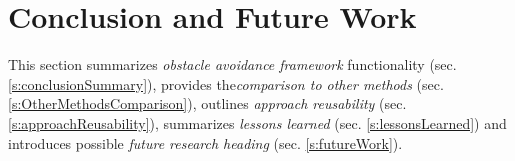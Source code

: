 \cleardoublepage
\chapter{Conclusion and Future Work}\label{ch:Conclusion}
\noindent This section summarizes \emph{obstacle avoidance framework} functionality (sec. \ref{s:conclusionSummary}), provides the\emph{comparison to other methods} (sec. \ref{s:OtherMethodsComparison}), outlines \emph{approach reusability} (sec. \ref{s:approachReusability}), summarizes \emph{lessons learned} (sec. \ref{s:lessonsLearned}) and introduces possible \emph{future research heading} (sec. \ref{s:futureWork}).